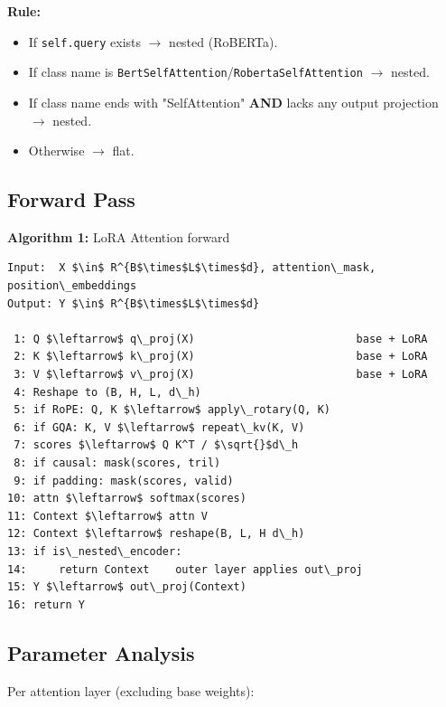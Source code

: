 \textbf{Rule:}
\begin{itemize}
\item If \texttt{self.query} exists $\to$ nested (RoBERTa).
\item If class name is \texttt{BertSelfAttention}/\texttt{RobertaSelfAttention} $\to$ nested.
\item If class name ends with "SelfAttention" \textbf{AND} lacks any output projection $\to$ nested.
\item Otherwise $\to$ flat.

\end{itemize}
\subsection{Forward Pass}

\textbf{Algorithm 1:} LoRA Attention forward
\begin{lstlisting}
Input:  X $\in$ R^{B$\times$L$\times$d}, attention\_mask, position\_embeddings
Output: Y $\in$ R^{B$\times$L$\times$d}

 1: Q $\leftarrow$ q\_proj(X)                         base + LoRA
 2: K $\leftarrow$ k\_proj(X)                         base + LoRA
 3: V $\leftarrow$ v\_proj(X)                         base + LoRA
 4: Reshape to (B, H, L, d\_h)
 5: if RoPE: Q, K $\leftarrow$ apply\_rotary(Q, K)
 6: if GQA: K, V $\leftarrow$ repeat\_kv(K, V)
 7: scores $\leftarrow$ Q K^T / $\sqrt{}$d\_h
 8: if causal: mask(scores, tril)
 9: if padding: mask(scores, valid)
10: attn $\leftarrow$ softmax(scores)
11: Context $\leftarrow$ attn V
12: Context $\leftarrow$ reshape(B, L, H d\_h)
13: if is\_nested\_encoder:
14:     return Context    outer layer applies out\_proj
15: Y $\leftarrow$ out\_proj(Context)
16: return Y
\end{lstlisting}

\subsection{Parameter Analysis}

Per attention layer (excluding base weights):

